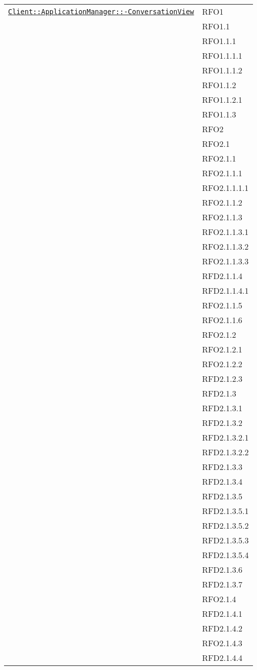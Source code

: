 \begin{longtable}{|>{\centering}m{10cm}|m{3cm}<{\centering}|}
\hyperref[Client::ApplicationManager::ConversationView]{\texttt{Client::ApplicationManager::-\linebreak ConversationView}} & RFO1\\
& RFO1.1\\
& RFO1.1.1\\
& RFO1.1.1.1\\
& RFO1.1.1.2\\
& RFO1.1.2\\
& RFO1.1.2.1\\
& RFO1.1.3\\
& RFO2\\
& RFO2.1\\
& RFO2.1.1\\
& RFO2.1.1.1\\
& RFO2.1.1.1.1\\
& RFO2.1.1.2\\
& RFO2.1.1.3\\
& RFO2.1.1.3.1\\
& RFO2.1.1.3.2\\
& RFO2.1.1.3.3\\
& RFD2.1.1.4\\
& RFD2.1.1.4.1\\
& RFO2.1.1.5\\
& RFO2.1.1.6\\
& RFO2.1.2\\
& RFO2.1.2.1\\
& RFO2.1.2.2\\
& RFD2.1.2.3\\
& RFD2.1.3\\
& RFD2.1.3.1\\
& RFD2.1.3.2\\
& RFD2.1.3.2.1\\
& RFD2.1.3.2.2\\
& RFD2.1.3.3\\
& RFD2.1.3.4\\
& RFD2.1.3.5\\
& RFD2.1.3.5.1\\
& RFD2.1.3.5.2\\
& RFD2.1.3.5.3\\
& RFD2.1.3.5.4\\
& RFD2.1.3.6\\
& RFD2.1.3.7\\
& RFO2.1.4\\
& RFD2.1.4.1\\
& RFD2.1.4.2\\
& RFO2.1.4.3\\
& RFD2.1.4.4\\

\end{longtable}
